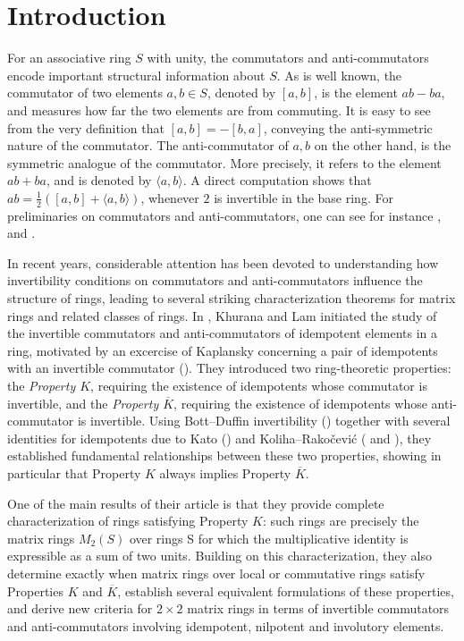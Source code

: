\documentclass[12pt]{amsart}
\theoremstyle{definition}
\numberwithin{equation}{section}
\begin{document}
\section{Introduction}

For an associative ring $S$ with unity, the commutators and anti-commutators encode important structural information about $S$. As is well known, the commutator of two elements $a,b \in S$, denoted by $[a,b]$, is the element $ab-ba$, and measures how far the two elements are from commuting. It is easy to see from the very definition that $[a,b] = -[b,a]$, conveying the anti-symmetric nature of the commutator. The anti-commutator of $a,b$ on the other hand, is the symmetric analogue of the commutator. More precisely, it refers to the element $ab+ba$, and is denoted by $\langle a,b \rangle$. A direct computation shows that $ab = \frac{1}{2}([a,b]+\langle a,b \rangle)$, whenever $2$ is invertible in the base ring. For preliminaries on commutators and anti-commutators, one can see for instance \cite{kaufman2014commutators}, \cite{Khurana01072012} and \cite{khurana2018idempotents}. 

In recent years, considerable attention has been devoted to understanding how invertibility conditions on commutators and anti-commutators influence the structure of rings, leading to several striking characterization theorems for matrix rings and related classes of rings. In \cite{khurana2018idempotents}, Khurana and Lam initiated the study of the invertible commutators and anti-commutators of idempotent elements in a ring, motivated by an excercise of Kaplansky concerning a pair of idempotents with an invertible commutator (\cite[p. 25]{kaplansky1968rings}). They introduced two ring-theoretic properties: the \textit{Property $K$}, requiring the existence of idempotents whose commutator is invertible, and the \textit{Property $\overline{K}$}, requiring the existence of idempotents whose anti-commutator is invertible. Using Bott--Duffin invertibility (\cite{Bott1953OnTA}) together with several identities for idempotents due to Kato (\cite[(I.4.34), (I.4.44)]{kato1995perturbation}) and Koliha--Rakočević (\cite{koliha2002invertibility} and \cite{koliha2003invertibility}), they established fundamental relationships between these two properties, showing in particular that Property $K$ always implies Property $\overline{K}$. 

One of the main results of their article  is that they provide complete characterization of rings satisfying Property $K$: such rings are precisely the matrix rings $M_{2}(S)$ over rings S for which the multiplicative identity is expressible as a sum of two units. Building on this characterization, they also determine exactly when matrix rings over local or commutative rings satisfy Properties $K$ and 
$\overline{K}$, establish several equivalent formulations of these properties, and derive new criteria for $2 \times 2$ matrix rings in terms of invertible commutators and anti-commutators involving idempotent, nilpotent and involutory elements. 
\end{document}
